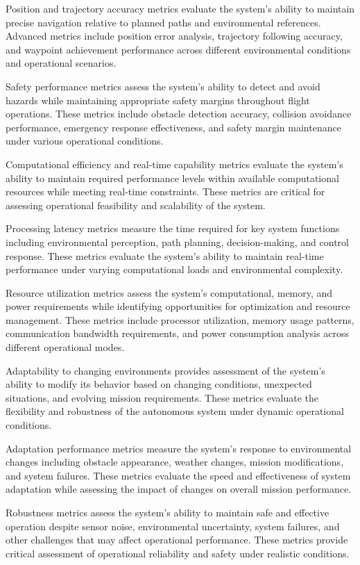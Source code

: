 Position and trajectory accuracy metrics evaluate the system's ability to maintain precise navigation relative to planned paths and environmental references. Advanced metrics include position error analysis, trajectory following accuracy, and waypoint achievement performance across different environmental conditions and operational scenarios.

Safety performance metrics assess the system's ability to detect and avoid hazards while maintaining appropriate safety margins throughout flight operations. These metrics include obstacle detection accuracy, collision avoidance performance, emergency response effectiveness, and safety margin maintenance under various operational conditions.

Computational efficiency and real-time capability metrics evaluate the system's ability to maintain required performance levels within available computational resources while meeting real-time constraints. These metrics are critical for assessing operational feasibility and scalability of the system.

Processing latency metrics measure the time required for key system functions including environmental perception, path planning, decision-making, and control response. These metrics evaluate the system's ability to maintain real-time performance under varying computational loads and environmental complexity.

Resource utilization metrics assess the system's computational, memory, and power requirements while identifying opportunities for optimization and resource management. These metrics include processor utilization, memory usage patterns, communication bandwidth requirements, and power consumption analysis across different operational modes.

Adaptability to changing environments provides assessment of the system's ability to modify its behavior based on changing conditions, unexpected situations, and evolving mission requirements. These metrics evaluate the flexibility and robustness of the autonomous system under dynamic operational conditions.

Adaptation performance metrics measure the system's response to environmental changes including obstacle appearance, weather changes, mission modifications, and system failures. These metrics evaluate the speed and effectiveness of system adaptation while assessing the impact of changes on overall mission performance.

Robustness metrics assess the system's ability to maintain safe and effective operation despite sensor noise, environmental uncertainty, system failures, and other challenges that may affect operational performance. These metrics provide critical assessment of operational reliability and safety under realistic conditions.

